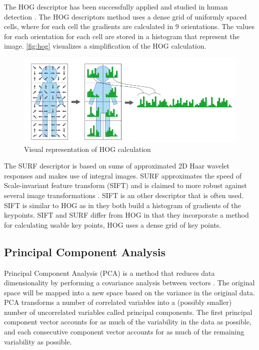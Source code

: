 The HOG descriptor has been successfully applied and studied in human detection \citep{NavneetDalal2006, watanabe2009}. The HOG descriptors method uses a dense grid of uniformly spaced cells, where for each cell the gradients are calculated in 9 orientations. The values for each orientation for each cell are stored in a histogram that represent the image. \autoref{fig:hog} visualizes a simplification of the HOG calculation. 

\begin{figure}[tb]
\center{}
\includegraphics[width=0.8\linewidth]{figures/hog.png}
\caption{Visual representation of HOG calculation}
\label{fig:hog}
\end{figure}


The SURF descriptor is based on sums of approximated 2D Haar wavelet responses and makes use of integral images. SURF approximates the speed of Scale-invariant feature transform (SIFT) and is claimed to more robust against several image transformations \citep{Murillo2007, Valgren2010}. SIFT is an other descriptor that is often used. SIFT is similar to HOG as in they both build a histogram of gradients of the keypoints. SIFT and SURF differ from HOG in that they incorporate a method for calculating usable key points, HOG uses a dense grid of key points.



\subsection{Principal Component Analysis}
Principal Component Analysis (PCA) is a method that reduces data dimensionality by performing a covariance analysis between vectors \cite{jolliffe2002}. The original space will be mapped into a new space based on the variance in the original data. PCA transforms a number of correlated variables into a (possibly smaller) number of uncorrelated variables called principal components. The first principal component vector accounts for as much of the variability in the data as possible, and each consecutive component vector accounts for as much of the remaining variability as possible. 

